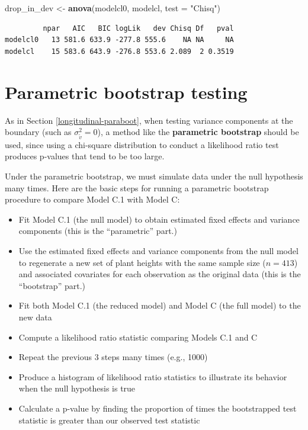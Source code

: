 \documentclass[
]{krantz}
\newenvironment{Shaded}{\begin{snugshade}}{\end{snugshade}}
\newcommand{\DataTypeTok}[1]{\textcolor[rgb]{0.27,0.27,0.27}{#1}}
\newcommand{\KeywordTok}[1]{\textcolor[rgb]{0.27,0.27,0.27}{\textbf{#1}}}
\newcommand{\NormalTok}[1]{#1}
\newcommand{\StringTok}[1]{\textcolor[rgb]{0.5,0.5,0.5}{#1}}
\providecommand{\tightlist}{%
  \setlength{\itemsep}{0pt}\setlength{\parskip}{0pt}}
\begin{document}
\begin{Shaded}
\begin{Highlighting}[]
\NormalTok{drop_in_dev <-}\StringTok{ }\KeywordTok{anova}\NormalTok{(modelcl0, modelcl, }\DataTypeTok{test =} \StringTok{"Chisq"}\NormalTok{)}
\end{Highlighting}
\end{Shaded}

\begin{verbatim}
         npar   AIC   BIC logLik   dev Chisq Df   pval
modelcl0   13 581.6 633.9 -277.8 555.6    NA NA     NA
modelcl    15 583.6 643.9 -276.8 553.6 2.089  2 0.3519
\end{verbatim}

\hypertarget{threelevel-paraboot}{%
\section{Parametric bootstrap testing}\label{threelevel-paraboot}}

As in Section \ref{longitudinal-paraboot}, when testing variance components at the boundary (such as \(\sigma_{\tilde{v}}^{2} = 0\)), a method like the \textbf{parametric bootstrap}  should be used, since using a chi-square distribution to conduct a likelihood ratio test produces p-values that tend to be too large.

Under the parametric bootstrap, we must simulate data under the null hypothesis many times. Here are the basic steps for running a parametric bootstrap procedure to compare Model C.1 with Model C:

\begin{itemize}
\tightlist
\item
  Fit Model C.1 (the null model) to obtain estimated fixed effects and variance components (this is the ``parametric'' part.)
\item
  Use the estimated fixed effects and variance components from the null model to regenerate a new set of plant heights with the same sample size (\(n=413\)) and associated covariates for each observation as the original data (this is the ``bootstrap'' part.)
\item
  Fit both Model C.1 (the reduced model) and Model C (the full model) to the new data
\item
  Compute a likelihood ratio statistic comparing Models C.1 and C
\item
  Repeat the previous 3 steps many times (e.g., 1000)
\item
  Produce a histogram of likelihood ratio statistics to illustrate its behavior when the null hypothesis is true
\item
  Calculate a p-value by finding the proportion of times the bootstrapped test statistic is greater than our observed test statistic
\end{itemize}
\end{document}
